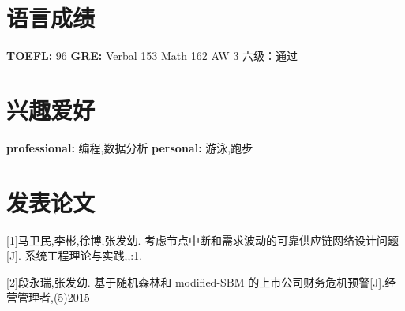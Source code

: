 \documentclass[print]{friggeri-cv} %
\begin{document}
\section{语言成绩}
{\textbf{TOEFL:} 96  \textbf{GRE:} Verbal 153 Math 162 AW 3 六级：通过}



\section{兴趣爱好}
{\textbf{professional:} 编程,数据分析
 \textbf{personal:} 游泳,跑步}


\section{发表论文}


[1]马卫民,李彬,徐博,张发幼. 考虑节点中断和需求波动的可靠供应链网络设计问题[J]. 系统工程理论与实践,,:1.

[2]段永瑞,张发幼. 基于随机森林和 modified-SBM 的上市公司财务危机预警[J].经营管理者,(5)2015 

%
%
%
%
%

\end{document}
